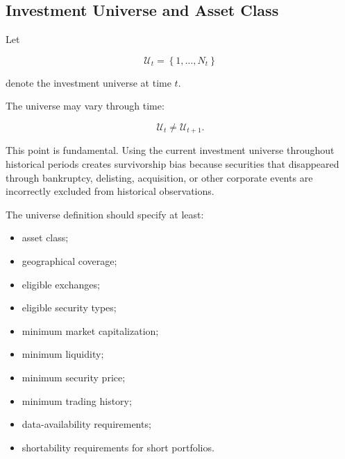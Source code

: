 \documentclass[11pt,a4paper]{article}
\begin{document}
\subsection{Investment Universe and Asset Class}
\label{subsec:investment_universe}

Let

\begin{equation}
\mathcal{U}_t
=
\left\{
1,\ldots,N_t
\right\}
\end{equation}

denote the investment universe at time $t$.

The universe may vary through time:

\begin{equation}
\mathcal{U}_t
\neq
\mathcal{U}_{t+1}.
\end{equation}

This point is fundamental. Using the current investment universe throughout
historical periods creates survivorship bias because securities that disappeared
through bankruptcy, delisting, acquisition, or other corporate events are
incorrectly excluded from historical observations.

The universe definition should specify at least:

\begin{itemize}
    \item asset class;

    \item geographical coverage;

    \item eligible exchanges;

    \item eligible security types;

    \item minimum market capitalization;

    \item minimum liquidity;

    \item minimum security price;

    \item minimum trading history;

    \item data-availability requirements;

    \item shortability requirements for short portfolios.
\end{itemize}
\end{document}
